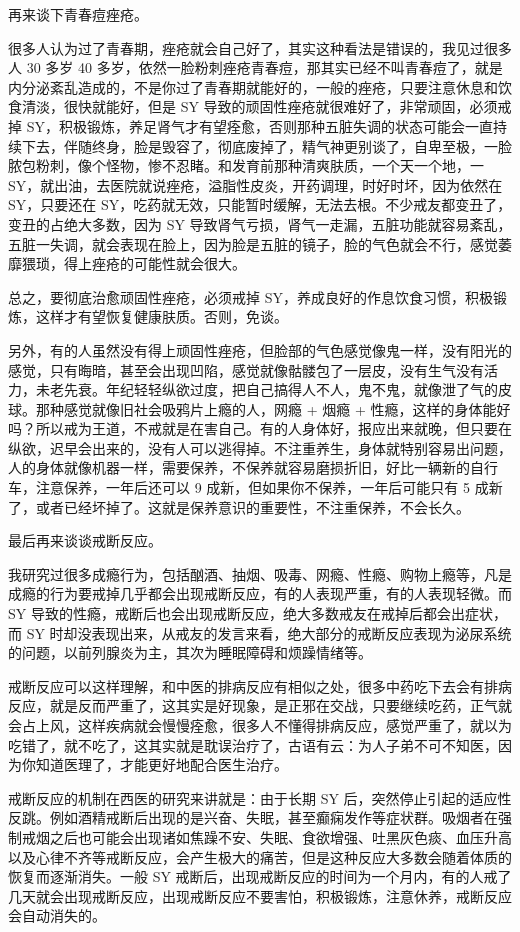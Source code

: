 \documentclass[fontset=founder]{ctexart}
\begin{document}
再来谈下青春痘痤疮。

很多人认为过了青春期，痤疮就会自己好了，其实这种看法是错误的，我见过很多人 30 多岁 40 多岁，依然一脸粉刺痤疮青春痘，那其实已经不叫青春痘了，就是内分泌紊乱造成的，不是你过了青春期就能好的，一般的痤疮，只要注意休息和饮食清淡，很快就能好，但是 SY 导致的顽固性痤疮就很难好了，非常顽固，必须戒掉 SY，积极锻炼，养足肾气才有望痊愈，否则那种五脏失调的状态可能会一直持续下去，伴随终身，脸是毁容了，彻底废掉了，精气神更别谈了，自卑至极，一脸脓包粉刺，像个怪物，惨不忍睹。和发育前那种清爽肤质，一个天一个地，一 SY，就出油，去医院就说痤疮，溢脂性皮炎，开药调理，时好时坏，因为依然在 SY，只要还在 SY，吃药就无效，只能暂时缓解，无法去根。不少戒友都变丑了，变丑的占绝大多数，因为 SY 导致肾气亏损，肾气一走漏，五脏功能就容易紊乱，五脏一失调，就会表现在脸上，因为脸是五脏的镜子，脸的气色就会不行，感觉萎靡猥琐，得上痤疮的可能性就会很大。

总之，要彻底治愈顽固性痤疮，必须戒掉 SY，养成良好的作息饮食习惯，积极锻炼，这样才有望恢复健康肤质。否则，免谈。

另外，有的人虽然没有得上顽固性痤疮，但脸部的气色感觉像鬼一样，没有阳光的感觉，只有晦暗，甚至会出现凹陷，感觉就像骷髅包了一层皮，没有生气没有活力，未老先衰。年纪轻轻纵欲过度，把自己搞得人不人，鬼不鬼，就像泄了气的皮球。那种感觉就像旧社会吸鸦片上瘾的人，网瘾 + 烟瘾 + 性瘾，这样的身体能好吗？所以戒为王道，不戒就是在害自己。有的人身体好，报应出来就晚，但只要在纵欲，迟早会出来的，没有人可以逃得掉。不注重养生，身体就特别容易出问题，人的身体就像机器一样，需要保养，不保养就容易磨损折旧，好比一辆新的自行车，注意保养，一年后还可以 9 成新，但如果你不保养，一年后可能只有 5 成新了，或者已经坏掉了。这就是保养意识的重要性，不注重保养，不会长久。

最后再来谈谈戒断反应。

我研究过很多成瘾行为，包括酗酒、抽烟、吸毒、网瘾、性瘾、购物上瘾等，凡是成瘾的行为要戒掉几乎都会出现戒断反应，有的人表现严重，有的人表现轻微。而 SY 导致的性瘾，戒断后也会出现戒断反应，绝大多数戒友在戒掉后都会出症状，而 SY 时却没表现出来，从戒友的发言来看，绝大部分的戒断反应表现为泌尿系统的问题，以前列腺炎为主，其次为睡眠障碍和烦躁情绪等。

戒断反应可以这样理解，和中医的排病反应有相似之处，很多中药吃下去会有排病反应，就是反而严重了，这其实是好现象，是正邪在交战，只要继续吃药，正气就会占上风，这样疾病就会慢慢痊愈，很多人不懂得排病反应，感觉严重了，就以为吃错了，就不吃了，这其实就是耽误治疗了，古语有云：为人子弟不可不知医，因为你知道医理了，才能更好地配合医生治疗。

戒断反应的机制在西医的研究来讲就是：由于长期 SY 后，突然停止引起的适应性反跳。例如酒精戒断后出现的是兴奋、失眠，甚至癫痫发作等症状群。吸烟者在强制戒烟之后也可能会出现诸如焦躁不安、失眠、食欲增强、吐黑灰色痰、血压升高以及心律不齐等戒断反应，会产生极大的痛苦，但是这种反应大多数会随着体质的恢复而逐渐消失。一般 SY 戒断后，出现戒断反应的时间为一个月内，有的人戒了几天就会出现戒断反应，出现戒断反应不要害怕，积极锻炼，注意休养，戒断反应会自动消失的。
\end{document}
